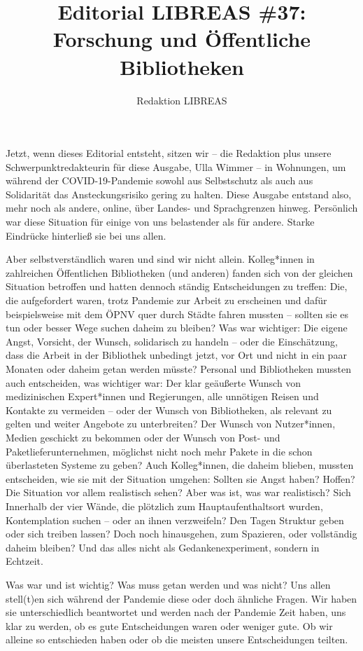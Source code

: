 \documentclass[a4paper,
fontsize=11pt,
oneside,
numbers=noperiodatend,
parskip=half-,
bibliography=totoc,
final
]{scrartcl}
\title{\LARGE{Editorial LIBREAS \#37: Forschung und Öffentliche Bibliotheken}}%
\author{Redaktion LIBREAS} %
\date{}
\begin{document}
\maketitle
\thispagestyle{fancyplain} 


Jetzt, wenn dieses Editorial entsteht, sitzen wir -- die Redaktion plus
unsere Schwerpunktredakteurin für diese Ausgabe, Ulla Wimmer -- in
Wohnungen, um während der COVID-19-Pandemie sowohl aus Selbstschutz als
auch aus Solidarität das Ansteckungsrisiko gering zu halten. Diese
Ausgabe entstand also, mehr noch als andere, online, über Landes- und
Sprachgrenzen hinweg. Persönlich war diese Situation für einige von uns
belastender als für andere. Starke Eindrücke hinterließ sie bei uns
allen.

Aber selbstverständlich waren und sind wir nicht allein. Kolleg*innen in
zahlreichen Öffentlichen Bibliotheken (und anderen) fanden sich von der
gleichen Situation betroffen und hatten dennoch ständig Entscheidungen
zu treffen: Die, die aufgefordert waren, trotz Pandemie zur Arbeit zu
erscheinen und dafür beispielsweise mit dem ÖPNV quer durch Städte
fahren mussten -- sollten sie es tun oder besser Wege suchen daheim zu
bleiben? Was war wichtiger: Die eigene Angst, Vorsicht, der Wunsch,
solidarisch zu handeln -- oder die Einschätzung, dass die Arbeit in der
Bibliothek unbedingt jetzt, vor Ort und nicht in ein paar Monaten oder
daheim getan werden müsste? Personal und Bibliotheken mussten auch
entscheiden, was wichtiger war: Der klar geäußerte Wunsch von
medizinischen Expert*innen und Regierungen, alle unnötigen Reisen und
Kontakte zu vermeiden -- oder der Wunsch von Bibliotheken, als relevant
zu gelten und weiter Angebote zu unterbreiten? Der Wunsch von
Nutzer*innen, Medien geschickt zu bekommen oder der Wunsch von Post- und
Paketlieferunternehmen, möglichst nicht noch mehr Pakete in die schon
überlasteten Systeme zu geben? Auch Kolleg*innen, die daheim blieben,
mussten entscheiden, wie sie mit der Situation umgehen: Sollten sie
Angst haben? Hoffen? Die Situation vor allem realistisch sehen? Aber was
ist, was war realistisch? Sich Innerhalb der vier Wände, die plötzlich
zum Hauptaufenthaltsort wurden, Kontemplation suchen -- oder an ihnen
verzweifeln? Den Tagen Struktur geben oder sich treiben lassen? Doch
noch hinausgehen, zum Spazieren, oder vollständig daheim bleiben? Und
das alles nicht als Gedankenexperiment, sondern in Echtzeit.

Was war und ist wichtig? Was muss getan werden und was nicht? Uns allen
stell(t)en sich während der Pandemie diese oder doch ähnliche Fragen.
Wir haben sie unterschiedlich beantwortet und werden nach der Pandemie
Zeit haben, uns klar zu werden, ob es gute Entscheidungen waren oder
weniger gute. Ob wir alleine so entschieden haben oder ob die meisten
unsere Entscheidungen teilten.
\end{document}
